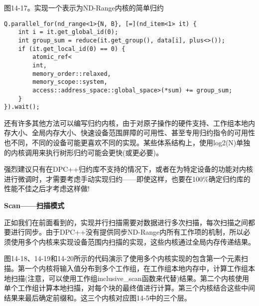 \hspace*{\fill} \par %
图14-17。实现一个表示为ND-Range内核的简单归约
\begin{lstlisting}[caption={}]
Q.parallel_for(nd_range<1>{N, B}, [=](nd_item<1> it) {
	int i = it.get_global_id(0);
	int group_sum = reduce(it.get_group(), data[i], plus<>());
	if (it.get_local_id(0) == 0) {
		atomic_ref<
		int,
		memory_order::relaxed,
		memory_scope::system,
		access::address_space::global_space>(*sum) += group_sum;
	}
}).wait();
\end{lstlisting}

还有许多其他方法可以编写归约内核，由于对原子操作的硬件支持、工作组本地内存大小、全局内存大小、快速设备范围屏障的可用性、甚至专用归约指令的可用性也不同，不同的设备可能更喜欢不同的实现。某些体系结构上，使用log2(N)单独的内核调用来执行树形归约可能会更快(或更必要)。\par

强烈建议只有在DPC++归约库不支持的情况下，或者在为特定设备的功能对内核进行微调时，才需要考虑手动实现归约——即使这样，也要在100\%确定归约库的性能不佳之后才考虑这样做!\par

\hspace*{\fill} \par %
\textbf{Scan——扫描模式}

正如我们在前面看到的，实现并行扫描需要对数据进行多次扫描，每次扫描之间都要进行同步。由于DPC++没有提供同步ND-Range内所有工作项的机制，所以必须使用多个内核来实现设备范围内扫描的实现，这些内核通过全局内存传递结果。\par

图14-18、14-19和14-20所示的代码演示了使用多个内核实现的包含第一个元素扫描。第一个内核将输入值分布到多个工作组，在工作组本地内存中，计算工作组本地扫描(注意，可以使用工作组inclusive\_scan函数来代替)结果。第二个内核使用单个工作组计算本地扫描，对每个块的最终值进行计算。第三个内核结合这些中间结果来最后确定前缀和。这三个内核对应图14-5中的三个层。\par

